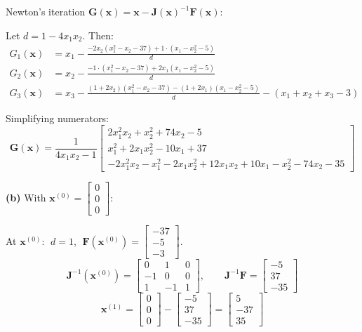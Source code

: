 \documentclass[12pt,letterpaper]{article}
\begin{document}
Newton's iteration $\mathbf{G}(\mathbf{x}) = \mathbf{x} - \mathbf{J}(\mathbf{x})^{-1}\mathbf{F}(\mathbf{x})$:

Let $d = 1 - 4x_1 x_2$. Then:
\begin{align*}
G_1(\mathbf{x}) &= x_1 - \frac{-2x_2(x_1^2 - x_2 - 37) + 1 \cdot (x_1 - x_2^2 - 5)}{d} \\[6pt]
G_2(\mathbf{x}) &= x_2 - \frac{-1 \cdot (x_1^2 - x_2 - 37) + 2x_1(x_1 - x_2^2 - 5)}{d} \\[6pt]
G_3(\mathbf{x}) &= x_3 - \frac{(1+2x_2)(x_1^2 - x_2 - 37) - (1+2x_1)(x_1 - x_2^2 - 5)}{d} - (x_1 + x_2 + x_3 - 3)
\end{align*}

Simplifying numerators:
\[
\boxed{\mathbf{G}(\mathbf{x}) = \frac{1}{4x_1 x_2 - 1}
\begin{bmatrix}
2x_1^2 x_2 + x_2^2 + 74x_2 - 5 \\[3pt]
x_1^2 + 2x_1 x_2^2 - 10x_1 + 37 \\[3pt]
-2x_1^2 x_2 - x_1^2 - 2x_1 x_2^2 + 12x_1 x_2 + 10x_1 - x_2^2 - 74x_2 - 35
\end{bmatrix}}
\]

\textbf{(b)} With $\mathbf{x}^{(0)} = \begin{bmatrix} 0 \\ 0 \\ 0 \end{bmatrix}$:

At $\mathbf{x}^{(0)}$: $\;d = 1$, $\;\mathbf{F}(\mathbf{x}^{(0)}) = \begin{bmatrix} -37 \\ -5 \\ -3 \end{bmatrix}$.
\vspace{-10pt}
\[
\mathbf{J}^{-1}(\mathbf{x}^{(0)}) = \begin{bmatrix} 0 & 1 & 0 \\ -1 & 0 & 0 \\ 1 & -1 & 1 \end{bmatrix}, \qquad
\mathbf{J}^{-1}\mathbf{F} = \begin{bmatrix} -5 \\ 37 \\ -35 \end{bmatrix}
\]
\[
\boxed{\mathbf{x}^{(1)} = \begin{bmatrix} 0 \\ 0 \\ 0 \end{bmatrix} - \begin{bmatrix} -5 \\ 37 \\ -35 \end{bmatrix} = \begin{bmatrix} 5 \\ -37 \\ 35 \end{bmatrix}}
\]
\end{document}
